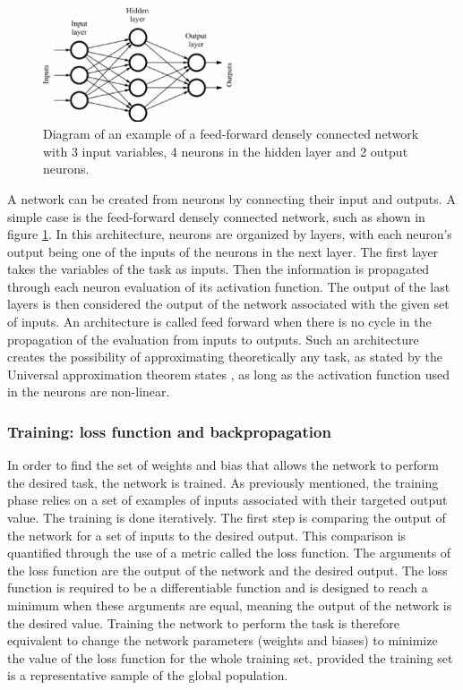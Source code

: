 \begin{figure}
    \centering
    \includegraphics[width=0.5\textwidth]{Images/dense_network.png}
    \caption{Diagram of an example of a feed-forward densely connected network with 3 input variables, 4 neurons in the hidden layer and 2 output neurons.}
    \label{fig:dense_network}
\end{figure}

A network can be created from neurons by connecting their input and outputs. A simple case is the feed-forward densely connected network, such as shown in figure \ref{fig:dense_network}. In this architecture, neurons are organized by layers, with each neuron's output being one of the inputs of the neurons in the next layer. The first layer takes the variables of the task as inputs. Then the information is propagated through each neuron evaluation of its activation function. The output of the last layers is then considered the output of the network associated with the given set of inputs. An architecture is called feed forward when there is no cycle in the propagation of the evaluation from inputs to outputs. Such an architecture creates the possibility of approximating theoretically any task, as stated by the Universal approximation theorem states \cite{Cybenko1989}, as long as the activation function used in the neurons are non-linear.

\subsubsection{Training: loss function and backpropagation}

In order to find the set of weights and bias that allows the network to perform the desired task, the network is trained.
As previously mentioned, the training phase relies on a set of examples of inputs associated with their targeted output value. The training is done iteratively. The first step is comparing the output of the network for a set of inputs to the desired output. This comparison is quantified through the use of a metric called the loss function. The arguments of the loss function are the output of the network and the desired output. The loss function is required to be a differentiable function and is designed to reach a minimum when these arguments are equal, meaning the output of the network is the desired value. Training the network to perform the task is therefore equivalent to change the network parameters (weights and biases) to minimize the value of the loss function for the whole training set, provided the training set is a representative sample of the global population.

